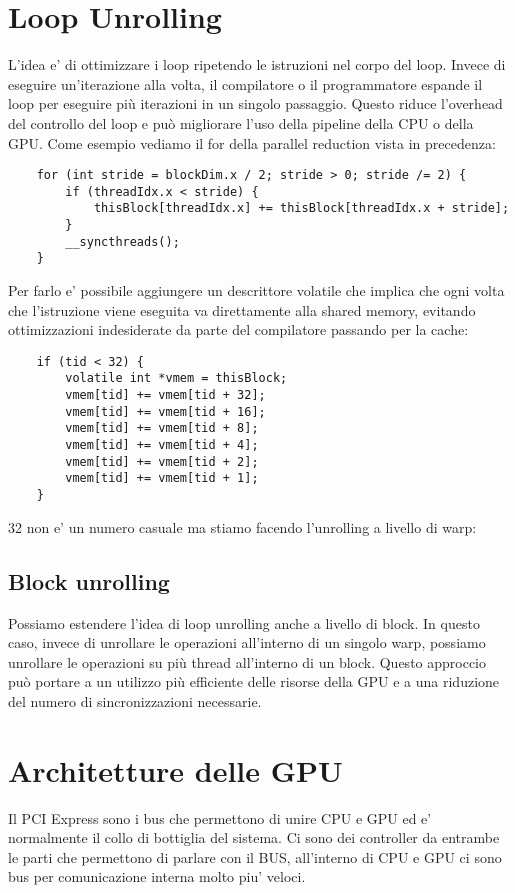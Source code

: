 \section{Loop Unrolling}
L'idea e' di ottimizzare i loop ripetendo le istruzioni nel corpo del loop. Invece di eseguire un'iterazione alla volta, il compilatore o il programmatore espande il loop per eseguire più iterazioni in un singolo passaggio. Questo riduce l'overhead del controllo del loop e può migliorare l'uso della pipeline della CPU o della GPU.
Come esempio vediamo il for della parallel reduction vista in precedenza:
\begin{lstlisting}
    for (int stride = blockDim.x / 2; stride > 0; stride /= 2) {
        if (threadIdx.x < stride) {
            thisBlock[threadIdx.x] += thisBlock[threadIdx.x + stride];
        }
        __syncthreads();
    }
\end{lstlisting}

Per farlo e' possibile aggiungere un descrittore volatile che implica che ogni volta che l'istruzione viene eseguita va direttamente alla shared memory, evitando ottimizzazioni indesiderate da parte del compilatore passando per la cache:
\begin{lstlisting}
    if (tid < 32) {
        volatile int *vmem = thisBlock;
        vmem[tid] += vmem[tid + 32];
        vmem[tid] += vmem[tid + 16];
        vmem[tid] += vmem[tid + 8];
        vmem[tid] += vmem[tid + 4];
        vmem[tid] += vmem[tid + 2];
        vmem[tid] += vmem[tid + 1];
    }
\end{lstlisting}
32 non e' un numero casuale ma stiamo facendo l'unrolling a livello di warp:

\subsection{Block unrolling}
Possiamo estendere l'idea di loop unrolling anche a livello di block. In questo caso, invece di unrollare le operazioni all'interno di un singolo warp, possiamo unrollare le operazioni su più thread all'interno di un block. Questo approccio può portare a un utilizzo più efficiente delle risorse della GPU e a una riduzione del numero di sincronizzazioni necessarie.

\section{Architetture delle GPU}
Il PCI Express sono i bus che permettono di unire CPU e GPU ed e' normalmente il collo di bottiglia del sistema. Ci sono dei controller da entrambe le parti che permettono di parlare con il BUS, all'interno di CPU e GPU ci sono bus per comunicazione interna molto piu' veloci.

